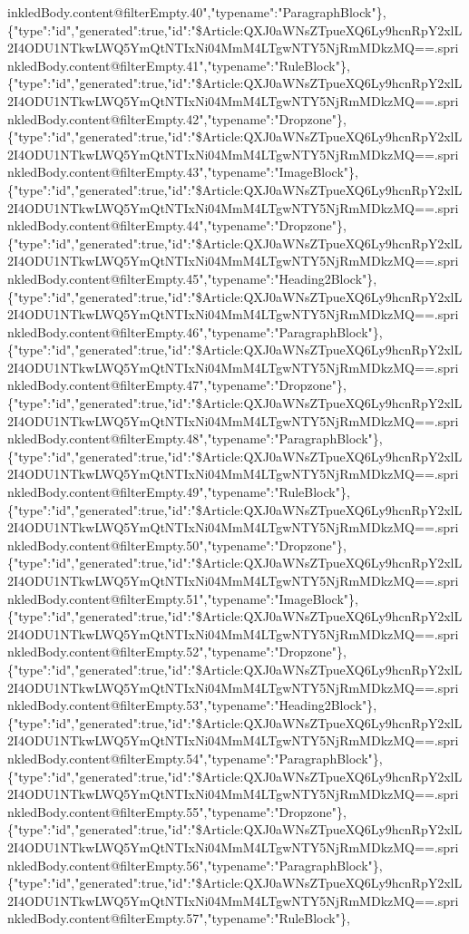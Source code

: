 inkledBody.content@filterEmpty.40","typename":"ParagraphBlock"\},\{"type":"id","generated":true,"id":"\$Article:QXJ0aWNsZTpueXQ6Ly9hcnRpY2xlL2I4ODU1NTkwLWQ5YmQtNTIxNi04MmM4LTgwNTY5NjRmMDkzMQ==.sprinkledBody.content@filterEmpty.41","typename":"RuleBlock"\},\{"type":"id","generated":true,"id":"\$Article:QXJ0aWNsZTpueXQ6Ly9hcnRpY2xlL2I4ODU1NTkwLWQ5YmQtNTIxNi04MmM4LTgwNTY5NjRmMDkzMQ==.sprinkledBody.content@filterEmpty.42","typename":"Dropzone"\},\{"type":"id","generated":true,"id":"\$Article:QXJ0aWNsZTpueXQ6Ly9hcnRpY2xlL2I4ODU1NTkwLWQ5YmQtNTIxNi04MmM4LTgwNTY5NjRmMDkzMQ==.sprinkledBody.content@filterEmpty.43","typename":"ImageBlock"\},\{"type":"id","generated":true,"id":"\$Article:QXJ0aWNsZTpueXQ6Ly9hcnRpY2xlL2I4ODU1NTkwLWQ5YmQtNTIxNi04MmM4LTgwNTY5NjRmMDkzMQ==.sprinkledBody.content@filterEmpty.44","typename":"Dropzone"\},\{"type":"id","generated":true,"id":"\$Article:QXJ0aWNsZTpueXQ6Ly9hcnRpY2xlL2I4ODU1NTkwLWQ5YmQtNTIxNi04MmM4LTgwNTY5NjRmMDkzMQ==.sprinkledBody.content@filterEmpty.45","typename":"Heading2Block"\},\{"type":"id","generated":true,"id":"\$Article:QXJ0aWNsZTpueXQ6Ly9hcnRpY2xlL2I4ODU1NTkwLWQ5YmQtNTIxNi04MmM4LTgwNTY5NjRmMDkzMQ==.sprinkledBody.content@filterEmpty.46","typename":"ParagraphBlock"\},\{"type":"id","generated":true,"id":"\$Article:QXJ0aWNsZTpueXQ6Ly9hcnRpY2xlL2I4ODU1NTkwLWQ5YmQtNTIxNi04MmM4LTgwNTY5NjRmMDkzMQ==.sprinkledBody.content@filterEmpty.47","typename":"Dropzone"\},\{"type":"id","generated":true,"id":"\$Article:QXJ0aWNsZTpueXQ6Ly9hcnRpY2xlL2I4ODU1NTkwLWQ5YmQtNTIxNi04MmM4LTgwNTY5NjRmMDkzMQ==.sprinkledBody.content@filterEmpty.48","typename":"ParagraphBlock"\},\{"type":"id","generated":true,"id":"\$Article:QXJ0aWNsZTpueXQ6Ly9hcnRpY2xlL2I4ODU1NTkwLWQ5YmQtNTIxNi04MmM4LTgwNTY5NjRmMDkzMQ==.sprinkledBody.content@filterEmpty.49","typename":"RuleBlock"\},\{"type":"id","generated":true,"id":"\$Article:QXJ0aWNsZTpueXQ6Ly9hcnRpY2xlL2I4ODU1NTkwLWQ5YmQtNTIxNi04MmM4LTgwNTY5NjRmMDkzMQ==.sprinkledBody.content@filterEmpty.50","typename":"Dropzone"\},\{"type":"id","generated":true,"id":"\$Article:QXJ0aWNsZTpueXQ6Ly9hcnRpY2xlL2I4ODU1NTkwLWQ5YmQtNTIxNi04MmM4LTgwNTY5NjRmMDkzMQ==.sprinkledBody.content@filterEmpty.51","typename":"ImageBlock"\},\{"type":"id","generated":true,"id":"\$Article:QXJ0aWNsZTpueXQ6Ly9hcnRpY2xlL2I4ODU1NTkwLWQ5YmQtNTIxNi04MmM4LTgwNTY5NjRmMDkzMQ==.sprinkledBody.content@filterEmpty.52","typename":"Dropzone"\},\{"type":"id","generated":true,"id":"\$Article:QXJ0aWNsZTpueXQ6Ly9hcnRpY2xlL2I4ODU1NTkwLWQ5YmQtNTIxNi04MmM4LTgwNTY5NjRmMDkzMQ==.sprinkledBody.content@filterEmpty.53","typename":"Heading2Block"\},\{"type":"id","generated":true,"id":"\$Article:QXJ0aWNsZTpueXQ6Ly9hcnRpY2xlL2I4ODU1NTkwLWQ5YmQtNTIxNi04MmM4LTgwNTY5NjRmMDkzMQ==.sprinkledBody.content@filterEmpty.54","typename":"ParagraphBlock"\},\{"type":"id","generated":true,"id":"\$Article:QXJ0aWNsZTpueXQ6Ly9hcnRpY2xlL2I4ODU1NTkwLWQ5YmQtNTIxNi04MmM4LTgwNTY5NjRmMDkzMQ==.sprinkledBody.content@filterEmpty.55","typename":"Dropzone"\},\{"type":"id","generated":true,"id":"\$Article:QXJ0aWNsZTpueXQ6Ly9hcnRpY2xlL2I4ODU1NTkwLWQ5YmQtNTIxNi04MmM4LTgwNTY5NjRmMDkzMQ==.sprinkledBody.content@filterEmpty.56","typename":"ParagraphBlock"\},\{"type":"id","generated":true,"id":"\$Article:QXJ0aWNsZTpueXQ6Ly9hcnRpY2xlL2I4ODU1NTkwLWQ5YmQtNTIxNi04MmM4LTgwNTY5NjRmMDkzMQ==.sprinkledBody.content@filterEmpty.57","typename":"RuleBlock"\},